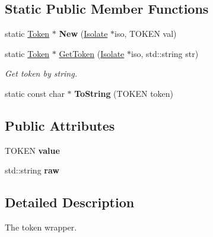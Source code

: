 \subsection*{Static Public Member Functions}
\begin{DoxyCompactItemize}
\item 
\hypertarget{class_cobra_1_1internal_1_1_token_a96e7ba54ee8d045d13fafb2699e41f38}{static \hyperlink{class_cobra_1_1internal_1_1_token}{Token} $\ast$ {\bfseries New} (\hyperlink{class_cobra_1_1internal_1_1_isolate}{Isolate} $\ast$iso, T\+O\+K\+E\+N val)}\label{class_cobra_1_1internal_1_1_token_a96e7ba54ee8d045d13fafb2699e41f38}

\item 
static \hyperlink{class_cobra_1_1internal_1_1_token}{Token} $\ast$ \hyperlink{class_cobra_1_1internal_1_1_token_acbbd70767107fe6116b1670bfcda1328}{Get\+Token} (\hyperlink{class_cobra_1_1internal_1_1_isolate}{Isolate} $\ast$iso, std\+::string str)
\begin{DoxyCompactList}\small\item\em Get token by string. \end{DoxyCompactList}\item 
\hypertarget{class_cobra_1_1internal_1_1_token_a6d0c35c7163cf921aadae357263b449f}{static const char $\ast$ {\bfseries To\+String} (T\+O\+K\+E\+N token)}\label{class_cobra_1_1internal_1_1_token_a6d0c35c7163cf921aadae357263b449f}

\end{DoxyCompactItemize}
\subsection*{Public Attributes}
\begin{DoxyCompactItemize}
\item 
\hypertarget{class_cobra_1_1internal_1_1_token_adcd2e429ed43b744ab9dd16450408570}{T\+O\+K\+E\+N {\bfseries value}}\label{class_cobra_1_1internal_1_1_token_adcd2e429ed43b744ab9dd16450408570}

\item 
\hypertarget{class_cobra_1_1internal_1_1_token_a7a9397cc323fa7f28fa49783977eb32b}{std\+::string {\bfseries raw}}\label{class_cobra_1_1internal_1_1_token_a7a9397cc323fa7f28fa49783977eb32b}

\end{DoxyCompactItemize}


\subsection{Detailed Description}
The token wrapper. 

